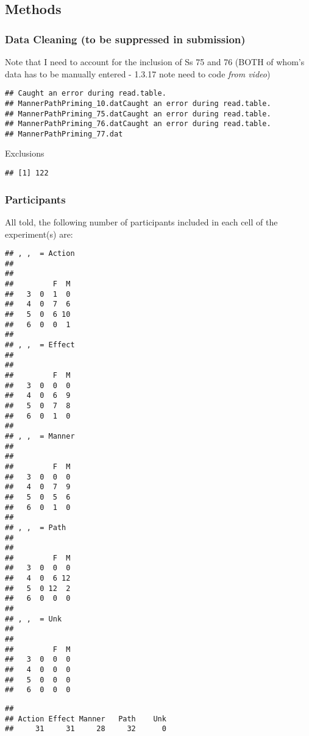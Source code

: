 \documentclass[english,man]{apa6}
\theoremstyle{definition}
\theoremstyle{definition}
\theoremstyle{remark}
\begin{document}
\subsection{Methods}\label{methods-1}

\subsubsection{Data Cleaning (to be suppressed in
submission)}\label{data-cleaning-to-be-suppressed-in-submission-1}

Note that I need to account for the inclusion of Ss 75 and 76 (BOTH of
whom's data has to be manually entered - 1.3.17 note need to code
\emph{from video})

\begin{verbatim}
## Caught an error during read.table.
## MannerPathPriming_10.datCaught an error during read.table.
## MannerPathPriming_75.datCaught an error during read.table.
## MannerPathPriming_76.datCaught an error during read.table.
## MannerPathPriming_77.dat
\end{verbatim}

Exclusions

\begin{verbatim}
## [1] 122
\end{verbatim}

\subsubsection{Participants}\label{participants-1}

All told, the following number of participants included in each cell of
the experiment(s) are:

\begin{verbatim}
## , ,  = Action
## 
##    
##         F  M
##   3  0  1  0
##   4  0  7  6
##   5  0  6 10
##   6  0  0  1
## 
## , ,  = Effect
## 
##    
##         F  M
##   3  0  0  0
##   4  0  6  9
##   5  0  7  8
##   6  0  1  0
## 
## , ,  = Manner
## 
##    
##         F  M
##   3  0  0  0
##   4  0  7  9
##   5  0  5  6
##   6  0  1  0
## 
## , ,  = Path
## 
##    
##         F  M
##   3  0  0  0
##   4  0  6 12
##   5  0 12  2
##   6  0  0  0
## 
## , ,  = Unk
## 
##    
##         F  M
##   3  0  0  0
##   4  0  0  0
##   5  0  0  0
##   6  0  0  0
\end{verbatim}

\begin{verbatim}
## 
## Action Effect Manner   Path    Unk 
##     31     31     28     32      0
\end{verbatim}
\end{document}
